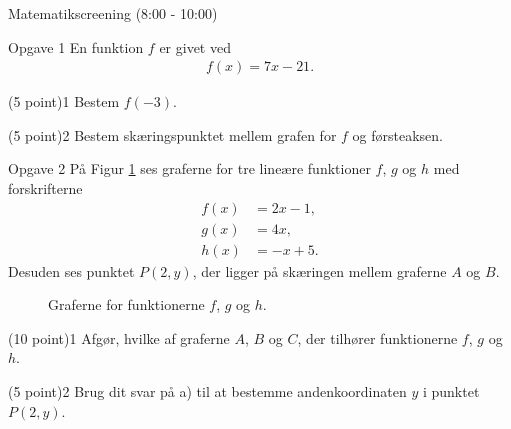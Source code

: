 
\begin{center}
\LARGE
Matematikscreening (8:00 - 10:00)
\end{center}

\begin{opgavetekst}{Opgave 1}
En funktion $f$ er givet ved 
\begin{align*}
f(x) = 7x - 21.
\end{align*}
\end{opgavetekst}
\begin{delopgave}{(5 point)}{1}
		Bestem $f(-3)$.
\end{delopgave}
\begin{delopgave}{(5 point)}{2}
	Bestem skæringspunktet mellem grafen for $f$ og førsteaksen.
\end{delopgave}
\begin{opgavetekst}{Opgave 2}
	På Figur \ref{fig:lines} ses graferne for tre lineære funktioner $f$, $g$ og $h$ 
	med forskrifterne 
	\begin{align*}
		f(x) &= 2x-1,\\
		g(x) &= 4x,\\
		h(x) &= -x+5.
	\end{align*}
	Desuden ses punktet $P(2,y)$, der ligger på skæringen mellem graferne $A$ og $B$.
	\begin{figure}[H]
		\centering
		\caption{Graferne for funktionerne $f$, $g$ og $h$.}
		\label{fig:lines}
	\end{figure}\phantom{h}
\end{opgavetekst}
\begin{delopgave}{(10 point)}{1}
	Afgør, hvilke af graferne $A$, $B$ og $C$, der tilhører funktionerne $f$, $g$ og $h$. 
\end{delopgave}
\begin{delopgave}{(5 point)}{2}
	Brug dit svar på a) til at bestemme andenkoordinaten $y$ i punktet $P(2,y)$.
\end{delopgave}

